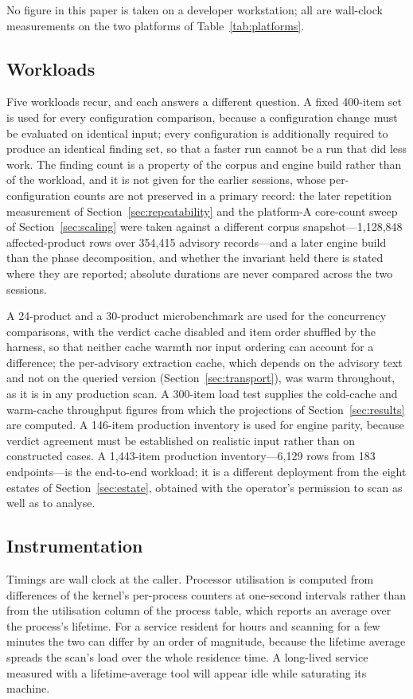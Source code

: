 \documentclass[fleqn,10pt,lineno]{wlpeerj}
\begin{document}
No figure in this paper is taken on a developer workstation; all are wall-clock measurements on the two platforms of Table~\ref{tab:platforms}.

\subsection{Workloads}
Five workloads recur, and each answers a different question. A fixed 400-item set is used for every configuration comparison, because a configuration change must be evaluated on identical input; every configuration is additionally required to produce an identical finding set, so that a faster run cannot be a run that did less work. The finding count is a property of the corpus and engine build rather than of the workload, and it is not given for the earlier sessions, whose per-configuration counts are not preserved in a primary record: the later repetition measurement of Section~\ref{sec:repeatability} and the platform-A core-count sweep of Section~\ref{sec:scaling} were taken against a different corpus snapshot---1,128,848 affected-product rows over 354,415 advisory records---and a later engine build than the phase decomposition, and whether the invariant held there is stated where they are reported; absolute durations are never compared across the two sessions.

A 24-product and a 30-product microbenchmark are used for the concurrency comparisons, with the verdict cache disabled and item order shuffled by the harness, so that neither cache warmth nor input ordering can account for a difference; the per-advisory extraction cache, which depends on the advisory text and not on the queried version (Section~\ref{sec:transport}), was warm throughout, as it is in any production scan. A 300-item load test supplies the cold-cache and warm-cache throughput figures from which the projections of Section~\ref{sec:results} are computed. A 146-item production inventory is used for engine parity, because verdict agreement must be established on realistic input rather than on constructed cases. A 1,443-item production inventory---6,129 rows from 183 endpoints---is the end-to-end workload; it is a different deployment from the eight estates of Section~\ref{sec:estate}, obtained with the operator's permission to scan as well as to analyse.

\subsection{Instrumentation}
Timings are wall clock at the caller. Processor utilisation is computed from differences of the kernel's per-process counters at one-second intervals rather than from the utilisation column of the process table, which reports an average over the process's lifetime. For a service resident for hours and scanning for a few minutes the two can differ by an order of magnitude, because the lifetime average spreads the scan's load over the whole residence time. A long-lived service measured with a lifetime-average tool will appear idle while saturating its machine.
\end{document}
